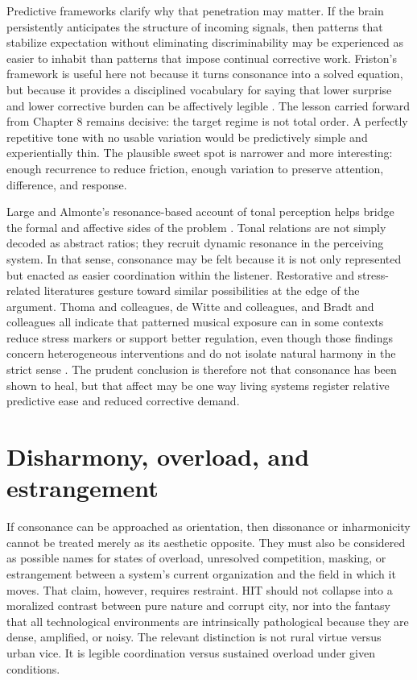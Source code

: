 Predictive frameworks clarify why that penetration may matter. If the brain persistently anticipates the structure of incoming signals, then patterns that stabilize expectation without eliminating discriminability may be experienced as easier to inhabit than patterns that impose continual corrective work. Friston's framework is useful here not because it turns consonance into a solved equation, but because it provides a disciplined vocabulary for saying that lower surprise and lower corrective burden can be affectively legible \parencite{friston_2010}. The lesson carried forward from Chapter 8 remains decisive: the target regime is not total order. A perfectly repetitive tone with no usable variation would be predictively simple and experientially thin. The plausible sweet spot is narrower and more interesting: enough recurrence to reduce friction, enough variation to preserve attention, difference, and response.

Large and Almonte's resonance-based account of tonal perception helps bridge the formal and affective sides of the problem \parencite{large_2012}. Tonal relations are not simply decoded as abstract ratios; they recruit dynamic resonance in the perceiving system. In that sense, consonance may be felt because it is not only represented but enacted as easier coordination within the listener. Restorative and stress-related literatures gesture toward similar possibilities at the edge of the argument. Thoma and colleagues, de Witte and colleagues, and Bradt and colleagues all indicate that patterned musical exposure can in some contexts reduce stress markers or support better regulation, even though those findings concern heterogeneous interventions and do not isolate natural harmony in the strict sense \parencite{thoma, de_witte, bradt_2021}. The prudent conclusion is therefore not that consonance has been shown to heal, but that affect may be one way living systems register relative predictive ease and reduced corrective demand.

\section{Disharmony, overload, and estrangement}

If consonance can be approached as orientation, then dissonance or inharmonicity cannot be treated merely as its aesthetic opposite. They must also be considered as possible names for states of overload, unresolved competition, masking, or estrangement between a system's current organization and the field in which it moves. That claim, however, requires restraint. HIT should not collapse into a moralized contrast between pure nature and corrupt city, nor into the fantasy that all technological environments are intrinsically pathological because they are dense, amplified, or noisy. The relevant distinction is not rural virtue versus urban vice. It is legible coordination versus sustained overload under given conditions.

